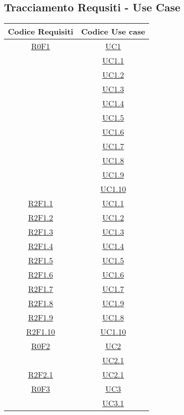 \subsection{Tracciamento Requsiti - Use Case}
\normalsize
\begin{longtable}{|c|c|}
\hline
\textbf{Codice Requisiti} & \textbf{Codice Use case} \\
\hline
\endhead
\hyperlink{R0F1}{R0F1} & \hyperlink{UC1}{UC1}\\
& \hyperlink{UC1.1}{UC1.1}\\
& \hyperlink{UC1.2}{UC1.2}\\
& \hyperlink{UC1.3}{UC1.3}\\
& \hyperlink{UC1.4}{UC1.4}\\
& \hyperlink{UC1.5}{UC1.5}\\
& \hyperlink{UC1.6}{UC1.6}\\
& \hyperlink{UC1.7}{UC1.7}\\
& \hyperlink{UC1.8}{UC1.8}\\
& \hyperlink{UC1.9}{UC1.9}\\
& \hyperlink{UC1.10}{UC1.10}\\
\hline
\hyperlink{R2F1.1}{R2F1.1} & \hyperlink{UC1.1}{UC1.1}\\
\hline
\hyperlink{R2F1.2}{R2F1.2} & \hyperlink{UC1.2}{UC1.2}\\
\hline
\hyperlink{R2F1.3}{R2F1.3} & \hyperlink{UC1.3}{UC1.3}\\
\hline
\hyperlink{R2F1.4}{R2F1.4} & \hyperlink{UC1.4}{UC1.4}\\
\hline
\hyperlink{R2F1.5}{R2F1.5} & \hyperlink{UC1.5}{UC1.5}\\
\hline
\hyperlink{R2F1.6}{R2F1.6} & \hyperlink{UC1.6}{UC1.6}\\
\hline
\hyperlink{R2F1.7}{R2F1.7} & \hyperlink{UC1.7}{UC1.7}\\
\hline
\hyperlink{R2F1.8}{R2F1.8} & \hyperlink{UC1.9}{UC1.9}\\
\hline
\hyperlink{R2F1.9}{R2F1.9} & \hyperlink{UC1.8}{UC1.8}\\
\hline
\hyperlink{R2F1.10}{R2F1.10} & \hyperlink{UC1.10}{UC1.10}\\
\hline
\hyperlink{R0F2}{R0F2} & \hyperlink{UC2}{UC2}\\
& \hyperlink{UC2.1}{UC2.1}\\
\hline
\hyperlink{R2F2.1}{R2F2.1} & \hyperlink{UC2.1}{UC2.1}\\
\hline
\hyperlink{R0F3}{R0F3} & \hyperlink{UC3}{UC3}\\
& \hyperlink{UC3.1}{UC3.1}\\

\end{longtable}
